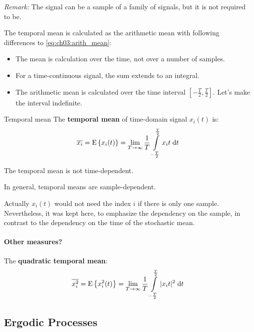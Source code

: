 \begin{refsection}
\textit{Remark:} The signal can be a sample of a family of signals, but it is not required to be.

The temporal mean is calculated as the arithmetic mean with following differences to \eqref{eq:ch03:arith_mean}:
\begin{itemize}
	\item The mean is calculation over the time, not over a number of samples.
	\item For a time-continuous signal, the sum extends to an integral.
	\item The arithmetic mean is calculated over the time interval $[-\frac{T}{2}, \frac{T}{2}]$. Let's make the interval indefinite.
\end{itemize}

\begin{definition}{Temporal mean}
	The  \textbf{temporal mean} of time-domain signal $x_i(t)$ is:
	\begin{equation}
		\overline{x_i} = \mathrm{E}\left\{x_i(t)\right\} = \lim\limits_{T \rightarrow \infty} \frac{1}{T} \int\limits_{-\frac{T}{2}}^{\frac{T}{2}} x_i{t} \; \mathrm{d} t
	\end{equation}%
\end{definition}

The temporal mean is not time-dependent.

\begin{fact}
	In general, temporal means are sample-dependent.
\end{fact}

Actually $x_i(t)$ would not need the index $i$ if there is only one sample. Nevertheless, it was kept here, to emphasize the dependency on the sample, in contrast to the dependency on the time of the stochastic mean.

\paragraph{Other measures?}

The  \textbf{quadratic temporal mean}:
\begin{equation}
	\overline{x^2_i} = \mathrm{E}\left\{x^2_i(t)\right\} = \lim\limits_{T \rightarrow \infty} \frac{1}{T} \int\limits_{-\frac{T}{2}}^{\frac{T}{2}} |x_i{t}|^2 \; \mathrm{d} t
\end{equation}

\subsection{Ergodic Processes}


\end{refsection}

